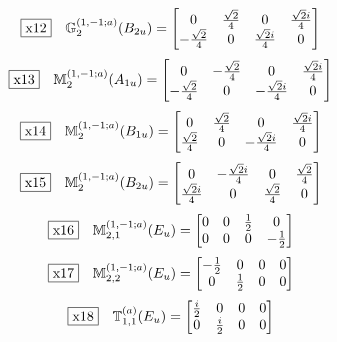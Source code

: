 \documentclass[fleqn,10pt,landscape]{jsarticle}
\begin{document}
\begin{dmath*}
\fbox{x12}\quad \mathbb{G}_{2}^{(1,-1;a)}(B_{2u})=\begin{bmatrix} 0 & \frac{\sqrt{2}}{4} & 0 & \frac{\sqrt{2} i}{4} \\ - \frac{\sqrt{2}}{4} & 0 & \frac{\sqrt{2} i}{4} & 0 \end{bmatrix}
\end{dmath*}
\begin{dmath*}
\fbox{x13}\quad \mathbb{M}_{2}^{(1,-1;a)}(A_{1u})=\begin{bmatrix} 0 & - \frac{\sqrt{2}}{4} & 0 & \frac{\sqrt{2} i}{4} \\ - \frac{\sqrt{2}}{4} & 0 & - \frac{\sqrt{2} i}{4} & 0 \end{bmatrix}
\end{dmath*}
\begin{dmath*}
\fbox{x14}\quad \mathbb{M}_{2}^{(1,-1;a)}(B_{1u})=\begin{bmatrix} 0 & \frac{\sqrt{2}}{4} & 0 & \frac{\sqrt{2} i}{4} \\ \frac{\sqrt{2}}{4} & 0 & - \frac{\sqrt{2} i}{4} & 0 \end{bmatrix}
\end{dmath*}
\begin{dmath*}
\fbox{x15}\quad \mathbb{M}_{2}^{(1,-1;a)}(B_{2u})=\begin{bmatrix} 0 & - \frac{\sqrt{2} i}{4} & 0 & \frac{\sqrt{2}}{4} \\ \frac{\sqrt{2} i}{4} & 0 & \frac{\sqrt{2}}{4} & 0 \end{bmatrix}
\end{dmath*}
\begin{dmath*}
\fbox{x16}\quad \mathbb{M}_{2,1}^{(1,-1;a)}(E_{u})=\begin{bmatrix} 0 & 0 & \frac{1}{2} & 0 \\ 0 & 0 & 0 & - \frac{1}{2} \end{bmatrix}
\end{dmath*}
\begin{dmath*}
\fbox{x17}\quad \mathbb{M}_{2,2}^{(1,-1;a)}(E_{u})=\begin{bmatrix} - \frac{1}{2} & 0 & 0 & 0 \\ 0 & \frac{1}{2} & 0 & 0 \end{bmatrix}
\end{dmath*}
\begin{dmath*}
\fbox{x18}\quad \mathbb{T}_{1,1}^{(a)}(E_{u})=\begin{bmatrix} \frac{i}{2} & 0 & 0 & 0 \\ 0 & \frac{i}{2} & 0 & 0 \end{bmatrix}
\end{dmath*}
\end{document}
